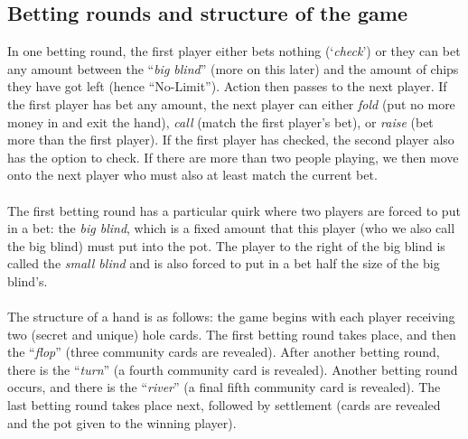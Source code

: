 \documentclass{article}
\begin{document}
\subsection{Betting rounds and structure of the game}
In one betting round, the first player either bets nothing (`\emph{check}') or they can bet any amount between the ``\emph{big blind}'' (more on this later) and the amount of chips they have got left (hence ``No-Limit''). Action then passes to the next player. If the first player has bet any amount, the next player can either \emph{fold} (put no more money in and exit the hand), \emph{call} (match the first player's bet), or \emph{raise} (bet more than the first player). If the first player has checked, the second player also has the option to check. If there are more than two people playing, we then move onto the next player who must also at least match the current bet.\\\\
The first betting round has a particular quirk where two players are forced to put in a bet: the \emph{big blind}, which is a fixed amount that this player (who we also call the big blind) must put into the pot. The player to the right of the big blind is called the \emph{small blind} and is also forced to put in a bet half the size of the big blind's.\\\\
The structure of a hand is as follows: the game begins with each player receiving two (secret and unique) hole cards. The first betting round takes place, and then the ``\emph{flop}'' (three community cards are revealed). After another betting round, there is the ``\emph{turn}'' (a fourth community card is revealed). Another betting round occurs, and there is the ``\emph{river}'' (a final fifth community card is revealed). The last betting round takes place next, followed by settlement (cards are revealed and the pot given to the winning player).
\newpage
\end{document}

